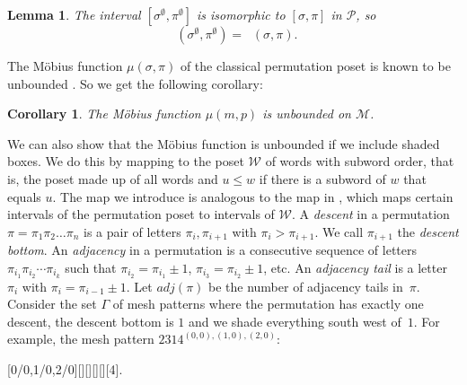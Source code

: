 \documentclass[preprint,11pt]{elsarticle}
\newtheorem{lem}[thm]{Lemma}\crefname{lem}{Lemma}{Lemmas}
\newtheorem{cor}[thm]{Corollary}\crefname{cor}{Corollary}{Corollaries}
\DeclareMathOperator{\muP}{\mu_\mathcal{P}}
\DeclareMathOperator{\muM}{\mu_\mathcal{M}}
\numberwithin{equation}{section}
\numberwithin{figure}{section}
\numberwithin{thm}{section}
\begin{document}
\begin{lem}
The interval $[\sigma^\emptyset,\pi^\emptyset]$ is isomorphic to
$[\sigma,\pi]$ in $\mathcal{P}$, so $$\muM(\sigma^\emptyset,\pi^\emptyset)=\muP(\sigma,\pi).$$
\end{lem}

The M\"obius function $\mu(\sigma,\pi)$ of the classical permutation poset is known to be
unbounded \cite{SagVat06}. So we get the following corollary:

\begin{cor}
The M\"obius function $\mu(m,p)$ is unbounded on $\mathcal{M}$.
\end{cor}

We can also show that the M\"obius function is unbounded if we include shaded boxes.
We do this by mapping to the poset $\mathcal{W}$ of words with subword order,  that is, 
the poset made up of all words and $u\le w$ if there is a subword of $w$
that equals $u$. The map we introduce is analogous to the map in \cite[Section 2]{Smith14},
which maps certain intervals of the permutation poset to intervals of $\mathcal{W}$.
A \emph{descent} in a permutation $\pi=\pi_1\pi_2\ldots\pi_n$ is a pair of
letters $\pi_i,\pi_{i+1}$ with $\pi_{i}>\pi_{i+1}$. We call $\pi_{i+1}$ the \emph{descent bottom}.
An \emph{adjacency} in a permutation
is a consecutive sequence of letters $\pi_{i_1} \pi_{i_2} \dotsm \pi_{i_k}$ such that
$\pi_{i_2} = \pi_{i_1} \pm 1$, $\pi_{i_3} = \pi_{i_2} \pm 1$, etc.
An \emph{adjacency tail} is a letter $\pi_i$ with $\pi_i=\pi_{i-1}\pm 1$.
Let $adj(\pi)$ be the number of adjacency tails in~$\pi$.
Consider the set $\Gamma$ of mesh patterns where the permutation has exactly one descent,
the descent bottom is $1$ and we shade everything south west of~$1$. For example, the mesh pattern $2314^{(0,0),(1,0),(2,0)}$:
\begin{center}
[0/0,1/0,2/0][][][][][4].
\end{center}
\end{document}
